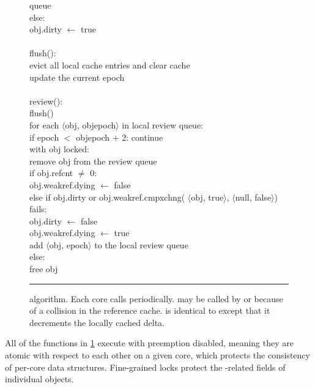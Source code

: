 \begin{figure}
\begin{tabbing}
            queue \-\\
          else: \+\\
            obj.dirty $\gets$ true \\
    \-\-\-\-\\[\fgap]
    flush(): \+\\
      evict all local cache entries and clear cache \\
      update the current epoch \\
    \-\\[\fgap]
    review(): \+\\
      flush() \\
      for each $\langle$obj, objepoch$\rangle$ in local review queue: \+\\
        if epoch $<$ objepoch + 2: continue \\
        with obj locked: \+\\
          remove obj from the review queue \\
          if obj.refcnt $\ne$ 0: \+\\
            obj.weakref.dying $\gets$ false \-\\
          else if obj.dirty or obj.weakref.cmpxchng(%
                $\langle$obj, true$\rangle$,
                $\langle$null, false$\rangle$) fails: \+\\
            obj.dirty $\gets$ false \\
            obj.weakref.dying $\gets$ true \\
            add $\langle$obj, epoch$\rangle$ to the local review queue \-\\
          else: \+\\
            free obj
  \end{tabbing}
  \vspace{-1em}                 %
  \rule{\columnwidth}{0.5pt}
  \vspace{-\baselineskip}
  \caption[ algorithm.]
  { algorithm.  Each core calls 
    periodically.   may be called by  or because of a
    collision in the reference cache.   is identical to  except
    that it decrements the locally cached delta.}
  \label{fig:refcache-code}
\end{figure}

All of the functions in \cref{fig:refcache-code} execute with
preemption disabled, meaning they are atomic with respect to each
other on a given core, which protects the consistency of per-core data
structures.  Fine-grained locks protect the -related fields
of individual objects.

